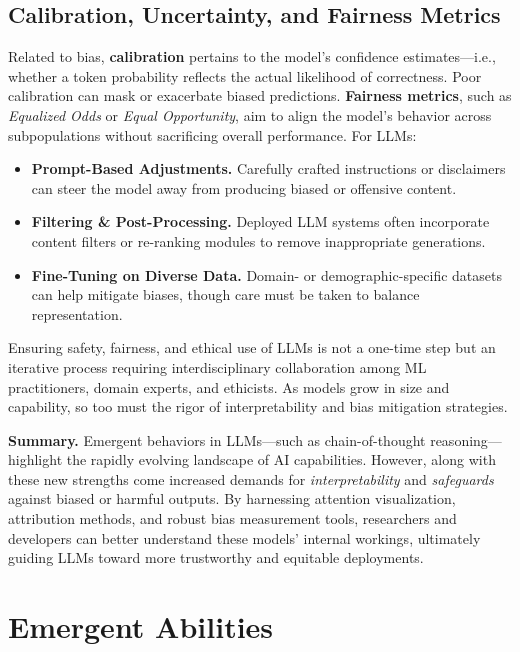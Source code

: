 \subsection{Calibration, Uncertainty, and Fairness Metrics}
\noindent
Related to bias, \textbf{calibration} pertains to the model's confidence estimates—i.e., whether a token probability reflects the actual likelihood of correctness. Poor calibration can mask or exacerbate biased predictions. \textbf{Fairness metrics}, such as \emph{Equalized Odds} or \emph{Equal Opportunity}, aim to align the model's behavior across subpopulations without sacrificing overall performance. For LLMs:
\begin{itemize}
    \item \textbf{Prompt-Based Adjustments.} Carefully crafted instructions or disclaimers can steer the model away from producing biased or offensive content.
    \item \textbf{Filtering \& Post-Processing.} Deployed LLM systems often incorporate content filters or re-ranking modules to remove inappropriate generations.
    \item \textbf{Fine-Tuning on Diverse Data.} Domain- or demographic-specific datasets can help mitigate biases, though care must be taken to balance representation.
\end{itemize}

\noindent
Ensuring safety, fairness, and ethical use of LLMs is not a one-time step but an iterative process requiring interdisciplinary collaboration among ML practitioners, domain experts, and ethicists. As models grow in size and capability, so too must the rigor of interpretability and bias mitigation strategies.

\bigskip
\noindent
\textbf{Summary.} Emergent behaviors in LLMs—such as chain-of-thought reasoning—highlight the rapidly evolving landscape of AI capabilities. However, along with these new strengths come increased demands for \emph{interpretability} and \emph{safeguards} against biased or harmful outputs. By harnessing attention visualization, attribution methods, and robust bias measurement tools, researchers and developers can better understand these models' internal workings, ultimately guiding LLMs toward more trustworthy and equitable deployments.

\section{Emergent Abilities}
\label{sec:emergent_abilities}

